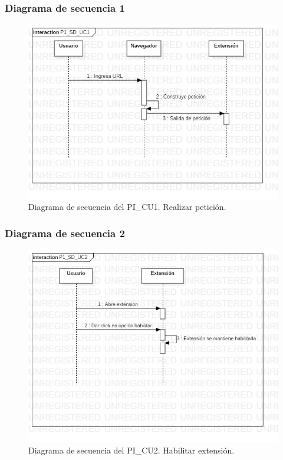 \documentclass[12pt, a4paper, titlepage]{report}
\begin{document}
            	\subsubsection{Diagrama de secuencia 1}
            	\begin{figure}[H]
				    \begin{center} \includegraphics[width=15cm]{./imagenes/Desarrollo/Prototipo_1/P1_SD_UC1.png}
				    \caption[Diagrama de secuencia 1 del Prototipo I]{Diagrama de secuencia del PI\_CU1. Realizar petición.}
			        \end{center}
			    \end{figure}
			    \subsubsection{Diagrama de secuencia 2}
			    \begin{figure}[H]
				    \begin{center} \includegraphics[width=15cm]{./imagenes/Desarrollo/Prototipo_1/P1_SD_UC2.png}
				    \caption[Diagrama de secuencia 2 del Prototipo I]{Diagrama de secuencia del PI\_CU2. Habilitar extensión.}
			        \end{center}
			    \end{figure}
\end{document}
